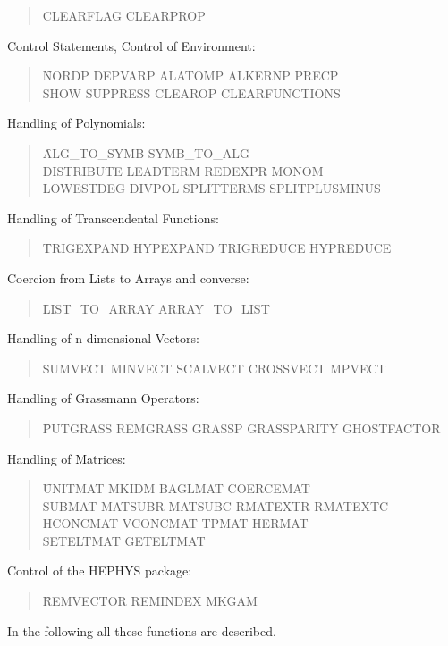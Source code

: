 \begin{itemize}
\begin{quotation}
{CLEARFLAG CLEARPROP }
\end{quotation}
\item{ Control Statements, Control of Environment:}
\begin{quotation}
\noindent
\f{NORDP DEPVARP ALATOMP ALKERNP PRECP \\
 SHOW SUPPRESS CLEAROP CLEARFUNCTIONS }
\end{quotation}
\item{Handling of Polynomials:}
\begin{quotation}
\noindent
\f{ALG\_TO\_SYMB SYMB\_TO\_ALG \\
DISTRIBUTE LEADTERM REDEXPR MONOM\\
LOWESTDEG DIVPOL SPLITTERMS SPLITPLUSMINUS}
\end{quotation}
\item{Handling of Transcendental Functions:}
\begin{quotation}
\noindent
\f{TRIGEXPAND HYPEXPAND TRIGREDUCE HYPREDUCE}
\end{quotation}
\item{Coercion from Lists to Arrays and converse:}
\begin{quotation}
\f{LIST\_TO\_ARRAY ARRAY\_TO\_LIST}
\end{quotation}
\item{Handling of n-dimensional Vectors:}
\begin{quotation}
\noindent
\f{SUMVECT MINVECT SCALVECT CROSSVECT MPVECT }
\end{quotation}
{\item Handling of Grassmann Operators:}
\begin{quotation}
\noindent
\f{PUTGRASS REMGRASS GRASSP GRASSPARITY GHOSTFACTOR }
\end{quotation}
\item{Handling of Matrices:}
\begin{quotation}
\noindent
\f{UNITMAT MKIDM BAGLMAT COERCEMAT \\
SUBMAT MATSUBR MATSUBC RMATEXTR RMATEXTC \\
 HCONCMAT VCONCMAT TPMAT HERMAT \\
SETELTMAT GETELTMAT}
\end{quotation}
\item{Control of the HEPHYS package:}
\begin{quotation}
\noindent
\f{REMVECTOR REMINDEX MKGAM}
\end{quotation}
\end{itemize}
In the following all these functions are described.
